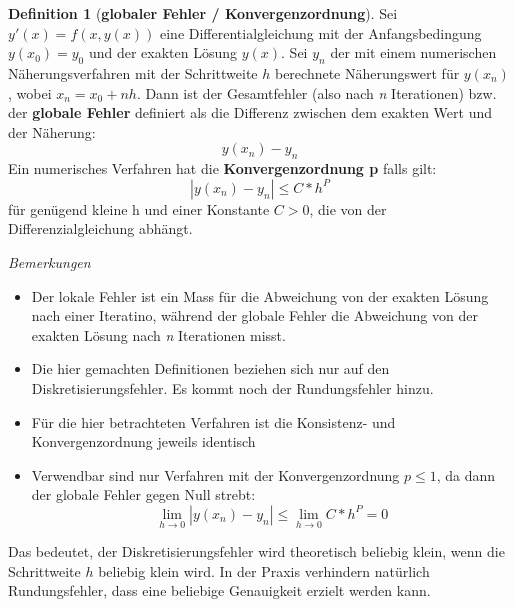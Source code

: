 \documentclass{article}
\theoremstyle{satz}
\theoremstyle{definition}
\newtheorem{definition}{Definition}
\begin{document}
\begin{tcolorbox}
\begin{definition}[\textbf{globaler Fehler / Konvergenzordnung}]
Sei $y'(x) = f(x, y(x))$ eine Differentialgleichung mit der Anfangsbedingung $y(x_0) = y_0$ und der exakten Lösung $y(x)$.
Sei $y_n$ der mit einem numerischen Näherungsverfahren mit der Schrittweite $h$ berechnete Näherungswert für $y(x_n)$, wobei $x_n = x_0 + nh$. Dann ist der Gesamtfehler (also nach \textit{n} Iterationen) bzw. der \textbf{globale Fehler} definiert als die Differenz zwischen dem exakten Wert und der Näherung:
\begin{equation}
y(x_n) - y_n
\end{equation}
Ein numerisches Verfahren hat die \textbf{Konvergenzordnung p} falls gilt:
\begin{equation}
|y(x_n) - y_n|\leq C * h^P
\end{equation}
für genügend kleine h und einer Konstante $C > 0$, die von der Differenzialgleichung abhängt.
\end{definition}
\end{tcolorbox}
\textit{Bemerkungen}\\
\begin{itemize}
\item Der lokale Fehler ist ein Mass für die Abweichung von der exakten Lösung nach einer Iteratino, während der globale Fehler die Abweichung von der exakten Lösung nach \textit{n} Iterationen misst.
\item Die hier gemachten Definitionen beziehen sich nur auf den Diskretisierungsfehler. Es kommt noch der Rundungsfehler hinzu. 
\item Für die hier betrachteten Verfahren ist die Konsistenz- und Konvergenzordnung jeweils identisch
\item {Verwendbar sind nur Verfahren mit der Konvergenzordnung $p \leq 1$, da dann der globale Fehler gegen Null strebt:
\begin{equation}
\lim_{h \rightarrow 0} |y(x_n) - y_n| \leq \lim_{h \rightarrow 0} C * h^P = 0
\end{equation}
}
\end{itemize}
Das bedeutet, der Diskretisierungsfehler wird theoretisch beliebig klein, wenn die Schrittweite $h$ beliebig klein wird. In der Praxis verhindern natürlich Rundungsfehler, dass eine beliebige Genauigkeit erzielt werden kann.
\end{document}
